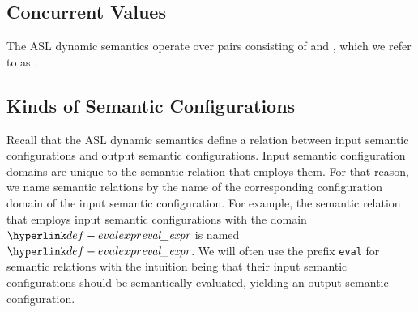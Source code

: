 \subsection{Concurrent Values\label{sec:ConcurrentValues}}
\hypertarget{def-concurrentnativevalue}{}
The ASL dynamic semantics operate over pairs consisting of \nativevaluesterm{} and \executiongraphs,
which we refer to as \concurrentnativevalues.

\subsection{Kinds of Semantic Configurations\label{sec:KindsOfSemanticConfigurations}}

Recall that the ASL dynamic semantics define a relation between input semantic configurations and output semantic configurations.
Input semantic configuration domains are unique to the semantic relation that employs them.
For that reason, we name semantic relations by the name of the corresponding configuration domain of the input semantic configuration.
For example, the semantic relation that employs input semantic configurations with the domain $\evalexpr$
is named $\evalexpr$.
%
We will often use the prefix \texttt{eval} for semantic relations with the intuition being that their input semantic configurations
should be semantically evaluated, yielding an output semantic configuration.

